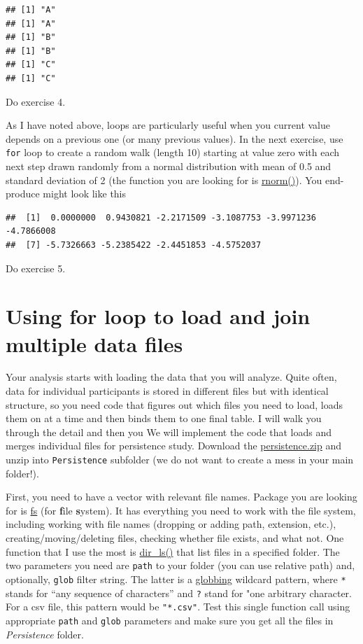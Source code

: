 \documentclass[
]{book}
\begin{document}
\begin{verbatim}
## [1] "A"
## [1] "A"
## [1] "B"
## [1] "B"
## [1] "C"
## [1] "C"
\end{verbatim}

Do exercise 4.

As I have noted above, loops are particularly useful when you current value depends on a previous one (or many previous values). In the next exercise, use \texttt{for} loop to create a random walk (length 10) starting at value zero with each next step drawn randomly from a normal distribution with mean of 0.5 and standard deviation of 2 (the function you are looking for is \href{https://stat.ethz.ch/R-manual/R-devel/library/stats/html/Normal.html}{rnorm()}). You end-produce might look like this

\begin{verbatim}
##  [1]  0.0000000  0.9430821 -2.2171509 -3.1087753 -3.9971236 -4.7866008
##  [7] -5.7326663 -5.2385422 -2.4451853 -4.5752037
\end{verbatim}

Do exercise 5.

\hypertarget{using-for-loop-to-load-and-join-multiple-data-files}{%
\section{Using for loop to load and join multiple data files}\label{using-for-loop-to-load-and-join-multiple-data-files}}

Your analysis starts with loading the data that you will analyze. Quite often, data for individual participants is stored in different files but with identical structure, so you need code that figures out which files you need to load, loads them on at a time and then binds them to one final table. I will walk you through the detail and then you We will implement the code that loads and merges individual files for persistence study. Download the \href{data/persistence.zip}{persistence.zip} and unzip into \texttt{Persistence} subfolder (we do not want to create a mess in your main folder!).

First, you need to have a vector with relevant file names. Package you are looking for is \href{https://github.com/r-lib/fs}{fs} (for \textbf{f}ile \textbf{s}ystem). It has everything you need to work with the file system, including working with file names (dropping or adding path, extension, etc.), creating/moving/deleting files, checking whether file exists, and what not. One function that I use the most is \href{https://www.rdocumentation.org/packages/fs/versions/1.5.0/topics/dir_ls}{dir\_ls()} that list files in a specified folder. The two parameters you need are \texttt{path} to your folder (you can use relative path) and, optionally, \texttt{glob} filter string. The latter is a \href{https://en.wikipedia.org/wiki/Glob_(programming)}{globbing} wildcard pattern, where \texttt{*} stands for ``any sequence of characters'' and \texttt{?} stand for "one arbitrary character. For a csv file, this pattern would be \texttt{"*.csv"}. Test this single function call using appropriate \texttt{path} and \texttt{glob} parameters and make sure you get all the files in \emph{Persistence} folder.
\end{document}
